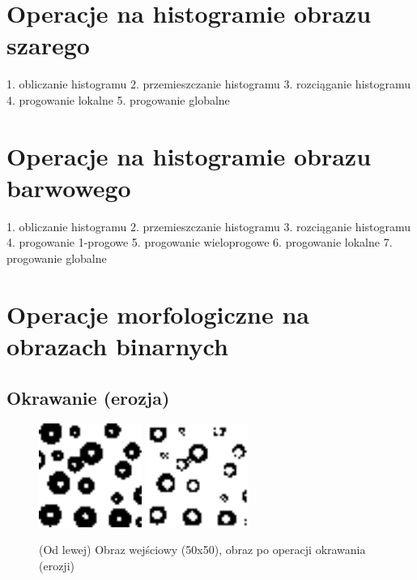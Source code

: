 \documentclass[final,a4paper,openany,12pt]{mwbk}
\begin{document}
\chapter{Operacje na histogramie obrazu szarego}
1. obliczanie histogramu
2. przemieszczanie histogramu
3. rozciąganie histogramu
4. progowanie lokalne
5. progowanie globalne

\chapter{Operacje na histogramie obrazu barwowego}
1. obliczanie histogramu
2. przemieszczanie histogramu
3. rozciąganie histogramu
4. progowanie 1-progowe
5. progowanie wieloprogowe
6. progowanie lokalne
7. progowanie globalne

\chapter{Operacje morfologiczne na obrazach binarnych}

\section{ Okrawanie (erozja)}

\begin{figure}[H]
	\begin{center}
		\includegraphics[width=0.3\textwidth]{1/1Bin_E_Original}
		\includegraphics[width=0.3\textwidth]{1/1Bin_E_Result}
	\end{center}
	\caption{(Od lewej) Obraz wejściowy (50x50), obraz po operacji okrawania (erozji) }
\end{figure}
\end{document}
